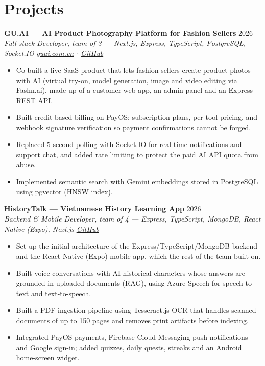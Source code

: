 \documentclass[a4paper,10pt]{article}
\newcommand{\entry}[4]{%
    \noindent\textbf{#1} \hfill #2 \\
    \noindent\textit{#3} \hfill \textit{#4}\par
}
\begin{document}
\section{Projects}

\entry{GU.AI --- AI Product Photography Platform for Fashion Sellers}{2026}
      {Full-stack Developer, team of 3 --- Next.js, Express, TypeScript, PostgreSQL, Socket.IO}
      {\href{https://guai.com.vn}{guai.com.vn} $\cdot$ \href{https://github.com/GU-AI-enterprise}{GitHub}}
\begin{itemize}
    \item Co-built a live SaaS product that lets fashion sellers create product photos with AI (virtual try-on, model generation, image and video editing via Fashn.ai), made up of a customer web app, an admin panel and an Express REST API.
    \item Built credit-based billing on PayOS: subscription plans, per-tool pricing, and webhook signature verification so payment confirmations cannot be forged.
    \item Replaced 5-second polling with Socket.IO for real-time notifications and support chat, and added rate limiting to protect the paid AI API quota from abuse.
    \item Implemented semantic search with Gemini embeddings stored in PostgreSQL using pgvector (HNSW index).
\end{itemize}

\entry{HistoryTalk --- Vietnamese History Learning App}{2026}
      {Backend \& Mobile Developer, team of 4 --- Express, TypeScript, MongoDB, React Native (Expo), Next.js}
      {\href{https://github.com/WDP301-HistoryTalk}{GitHub}}
\begin{itemize}
    \item Set up the initial architecture of the Express/TypeScript/MongoDB backend and the React Native (Expo) mobile app, which the rest of the team built on.
    \item Built voice conversations with AI historical characters whose answers are grounded in uploaded documents (RAG), using Azure Speech for speech-to-text and text-to-speech.
    \item Built a PDF ingestion pipeline using Tesseract.js OCR that handles scanned documents of up to 150 pages and removes print artifacts before indexing.
    \item Integrated PayOS payments, Firebase Cloud Messaging push notifications and Google sign-in; added quizzes, daily quests, streaks and an Android home-screen widget.
\end{itemize}
\end{document}
